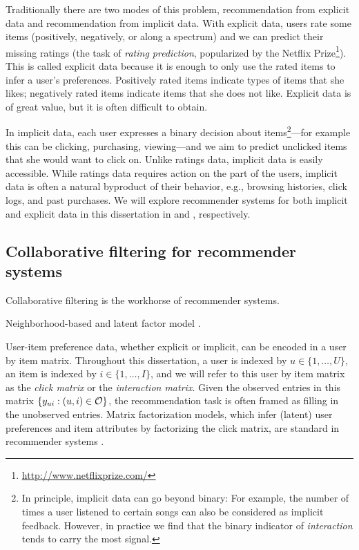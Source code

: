 Traditionally there are two modes of this problem, recommendation from
explicit data and recommendation from implicit data.  With explicit
data, users rate some items (positively, negatively, or along a
spectrum) and we can predict their missing ratings (the task of \textit{rating prediction}, popularized by the Netflix Prize\footnote{\url{http://www.netflixprize.com/}}). This is called explicit data because it is enough to only use the rated items to infer a user's
preferences. Positively rated items indicate types of items that she
likes; negatively rated items indicate items that she does not like. Explicit data is of great value, but it is often difficult to obtain. 

In implicit data, each user expresses a binary decision about items\footnote{In principle, implicit data can go beyond binary: For example, the number of times a user listened to certain songs can also be considered as implicit feedback. However, in practice we find that the binary indicator of \textit{interaction} tends to carry the most signal. }---for
example this can be clicking, purchasing, viewing---and we aim to
predict unclicked items that she would want to click on. Unlike
ratings data, implicit data is easily accessible.  While ratings data
requires action on the part of the users, implicit data is often a
natural byproduct of their behavior, e.g., browsing histories, click
logs, and past purchases. We will explore recommender systems for both implicit and explicit data in this dissertation in  and , respectively.

\subsection{Collaborative filtering for recommender systems} \label{chpt:background:sec:cf}

\PP Collaborative filtering is the workhorse of recommender systems.

\PP Neighborhood-based \citep{sarwar2001item} and latent factor model \citep{koren2009matrix}.

 User-item preference data, whether explicit or implicit, can be encoded in a user by item matrix. Throughout this dissertation, a user is indexed by $u \in \{1, \dots, U\}$, an item is indexed by $i \in \{1, \dots, I\}$, and we will refer to this user by item matrix as the \emph{click matrix} or the \emph{interaction matrix}. Given the observed entries in this matrix $\{y_{ui}: (u, i) \in \mathcal{O}\}$, the recommendation task is often framed as filling in the unobserved entries.  Matrix factorization models, which infer (latent) user preferences and item attributes by factorizing the click matrix, are standard in recommender systems \citep{koren2009matrix}. 

